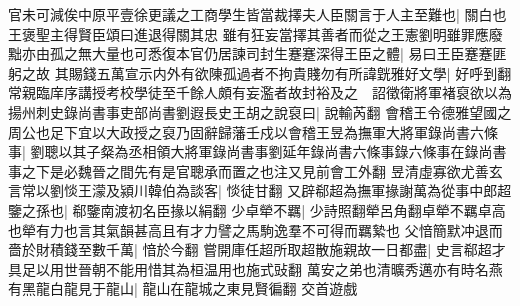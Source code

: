 官未可減俟中原平壹徐更議之工商學生皆當裁擇夫人臣關言于人主至難也|{
	關白也王褒聖主得賢臣頌曰進退得關其忠}
雖有狂妄當擇其善者而從之王憲劉明雖罪應廢黜亦由孤之無大量也可悉復本官仍居諫司封生蹇蹇深得王臣之體|{
	易曰王臣蹇蹇匪躬之故}
其賜錢五萬宣示内外有欲陳孤過者不拘貴賤勿有所諱皝雅好文學|{
	好呼到翻}
常親臨庠序講授考校學徒至千餘人頗有妄濫者故封裕及之　詔徵衛將軍褚裒欲以為揚州刺史錄尚書事吏部尚書劉遐長史王胡之說裒曰|{
	說輸芮翻}
會稽王令德雅望國之周公也足下宜以大政授之裒乃固辭歸藩壬戍以會稽王昱為撫軍大將軍錄尚書六條事|{
	劉聰以其子粲為丞相領大將軍錄尚書事劉延年錄尚書六條事錄六條事在錄尚書事之下是必魏晉之間先有是官聰承而置之也注又見前會工外翻}
昱清虛寡欲尤善玄言常以劉惔王濛及潁川韓伯為談客|{
	惔徒甘翻}
又辟郗超為撫軍掾謝萬為從事中郎超鑒之孫也|{
	郗鑒南渡初名臣掾以絹翻}
少卓犖不羈|{
	少詩照翻犖呂角翻卓犖不羈卓高也犖有力也言其氣韻甚高且有才力譬之馬駒逸羣不可得而羈縶也}
父愔簡默冲退而嗇於財積錢至數千萬|{
	愔於今翻}
嘗開庫任超所取超散施親故一日都盡|{
	史言郗超才具足以用世晉朝不能用惜其為桓温用也施式䜴翻}
萬安之弟也清曠秀邁亦有時名燕有黑龍白龍見于龍山|{
	龍山在龍城之東見賢徧翻}
交首遊戲

